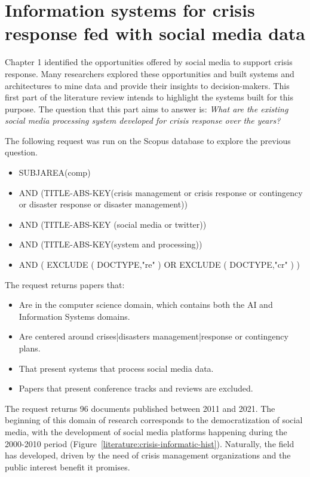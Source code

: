 \section{Information systems for crisis response fed with social media data}
Chapter 1 identified the opportunities offered by social media to support crisis response.
Many researchers explored these opportunities and built systems and architectures to mine data and provide their insights to decision-makers.
This first part of the literature review intends to highlight the systems built for this purpose.
The question that this part aims to answer is: \emph{What are the existing social media processing system developed for crisis response over the years?}

The following request was run on the Scopus database to explore the previous question.

\begin{itemize}
    \item SUBJAREA(comp)
    \item AND (TITLE-ABS-KEY({crisis management} or {crisis response} or contingency or {disaster response} or {disaster management}))
    \item AND (TITLE-ABS-KEY ({social media} or twitter))
    \item AND (TITLE-ABS-KEY(system and processing))
    \item AND ( EXCLUDE ( DOCTYPE,"re" ) OR EXCLUDE ( DOCTYPE,"cr" ) )
\end{itemize}

The request returns papers that:

\begin{itemize}
    \item Are in the computer science domain, which contains both the AI and Information Systems domains.
    \item Are centered around crises|disasters management|response or contingency plans.
    \item That present systems that process social media data.
    \item Papers that present conference tracks and reviews are excluded.
\end{itemize}

The request returns 96 documents published between 2011 and 2021.
The beginning of this domain of research corresponds to the democratization of social media, with the development of social media platforms happening during the 2000-2010 period (Figure~\ref{literature:crisis-informatic-hist}).
Naturally, the field has developed, driven by the need of crisis management organizations and the public interest benefit it promises.

